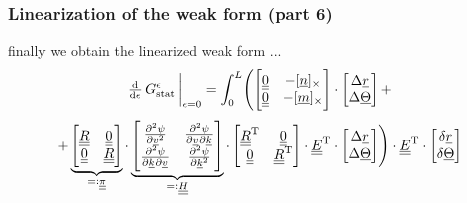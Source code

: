 \begin{frame}
  \frametitle{Linearization of the weak form (part 6)}

  finally we obtain the linearized weak form ...
  \begin{displaymath}
    \od{}{\epsilon} \, G_{\text{stat}}^{\epsilon} \sVert[3]_{\epsilon=0} =
    \int_0^L \Biggl(
      \begin{bmatrix}
        \doubleunderline{0} & - [ \underline{n} ]_{\times} \\
        \doubleunderline{0} & - [ \underline{m} ]_{\times}
      \end{bmatrix} \cdot
      \begin{bmatrix}
        \Delta \underline{r} \\
        \Delta \underline{\Theta}
      \end{bmatrix} +
    \end{displaymath}
    \begin{displaymath}
     + \underbrace{
      \begin{bmatrix}
        \doubleunderline{R} & \doubleunderline{0} \\
        \doubleunderline{0} & \doubleunderline{R}
      \end{bmatrix}}_{=: \doubleunderline{\pi}} \cdot
      \underbrace{
      \begin{bmatrix}
        \pd[2]{\psi}{\underline{v}} & \md{\psi}{2}{\underline{v}}{}{\underline{k}}{} \\
        \md{\psi}{2}{\underline{k}}{}{\underline{v}}{} & \pd[2]{\psi}{\underline{k}}
      \end{bmatrix}}_{=: \doubleunderline{H}} \cdot
      \begin{bmatrix}
        \doubleunderline{R}^{\mathrm{T}} & \doubleunderline{0} \\
        \doubleunderline{0} & \doubleunderline{R}^{\mathrm{T}}
      \end{bmatrix} \cdot
      \doubleunderline{E}^{\mathrm{T}} \cdot
      \begin{bmatrix}
        \Delta \underline{r} \\
        \Delta \underline{\Theta}
      \end{bmatrix} \Biggr) \cdot
      \doubleunderline{E}^{\mathrm{T}} \cdot
      \begin{bmatrix}
        \delta \underline{r} \\ \delta \underline{\Theta}
      \end{bmatrix}

\end{displaymath}
\end{frame}
